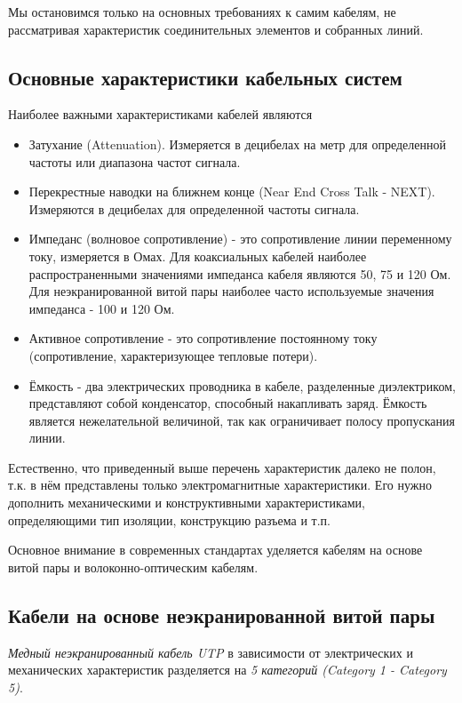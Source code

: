 Мы остановимся только на основных требованиях к самим кабелям, не рассматривая характеристик соединительных элементов и собранных линий.

\subsection{Основные характеристики кабельных систем}

Наиболее важными характеристиками кабелей являются
\begin{itemize}
    \item Затухание (Attenuation).
        Измеряется в децибелах на метр для определенной частоты или диапазона частот сигнала.
    \item Перекрестные наводки на ближнем конце (Near End Cross Talk - NEXT).
        Измеряются в децибелах для определенной частоты сигнала.
    \item Импеданс (волновое сопротивление) - это сопротивление линии переменному току, измеряется в Омах.
        Для коаксиальных кабелей наиболее распространенными значениями импеданса кабеля являются 50, 75 и 120 Ом.
        Для неэкранированной витой пары наиболее часто используемые значения импеданса - 100 и 120 Ом.
    \item Активное сопротивление - это сопротивление постоянному току (сопротивление, характеризующее тепловые потери).
    \item Ёмкость - два электрических проводника в кабеле, разделенные диэлектриком, представляют собой конденсатор, способный накапливать заряд.
        Ёмкость является нежелательной величиной, так как ограничивает полосу пропускания линии.
\end{itemize}

Естественно, что приведенный выше перечень характеристик далеко не полон, т.к. в нём представлены только электромагнитные характеристики.
Его нужно дополнить механическими и конструктивными характеристиками, определяющими тип изоляции, конструкцию разъема и т.п.

Основное внимание в современных стандартах уделяется кабелям на основе витой пары и волоконно-оптическим кабелям.

\subsection{Кабели на основе неэкранированной витой пары}

\emph{Медный неэкранированный кабель UTP} в зависимости от электрических и механических характеристик разделяется на \emph{5 категорий (Category 1 - Category 5)}.

